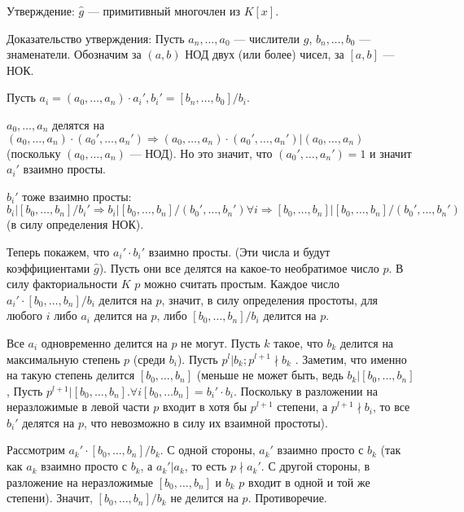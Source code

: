 \documentclass[../main.tex]{subfiles}
\begin{document}
    Утверждение: $\hat{g}$ --- примитивный многочлен из $K[x]$.

    Доказательство утверждения: Пусть $a_n, \ldots, a_0$ --- числители $g$,
    $b_n, \ldots, b_0$ --- знаменатели. Обозначим за $(a, b)$ НОД двух
    (или более) чисел, за $[a, b]$ --- НОК.

    Пусть $a_i = (a_0, \ldots, a_n) \cdot a_i',
    b_i' = [b_n, \ldots, b_0] / b_i$.

    $a_0, \ldots, a_n$ делятся на
    $(a_0, \ldots, a_n) \cdot (a_0', \ldots, a_n') \Rightarrow
    (a_0, \ldots, a_n) \cdot (a_0', \ldots, a_n') | (a_0, \ldots, a_n)$
    (поскольку $(a_0, \ldots, a_n)$ --- НОД). Но это значит, что
    $(a_0', \ldots, a_n') = 1$ и значит $a_i'$ взаимно просты.

    $b_i'$ тоже взаимно просты: $b_i | [b_0, \ldots, b_n] / b_i' \Rightarrow
    b_i | [b_0, \ldots, b_n] / (b_0', \ldots, b_n') \forall i \Rightarrow
    [b_0, \ldots, b_n] | [b_0, \ldots, b_n] / (b_0', \ldots, b_n')$
    (в силу определения НОК).

    Теперь покажем, что $a_i' \cdot b_i'$ взаимно просты.
    (Эти числа и будут коэффициентами $\hat{g}$). Пусть они все делятся
    на какое-то необратимое число $p$. В силу факториальности $K$ $p$ можно
    считать простым. Каждое число $a_i' \cdot [b_0, \ldots, b_n] / b_i$
    делится на $p$, значит, в силу определения простоты, для любого $i$
    либо $a_i$ делится на $p$, либо $[b_0, \ldots, b_n] / b_i$ делится на $p$.

    Все $a_i$ одновременно делится на $p$ не могут. Пусть $k$ такое, что
    $b_k$ делится на максимальную степень $p$ (среди $b_i$).
    Пусть $p^l | b_k; p^{l + 1} \nmid b_k$ . Заметим, что
    именно на такую степень делится $[b_0, \ldots, b_n]$
    (меньше не может быть, ведь $b_k | [b_0, \ldots, b_n]$,
    Пусть $p^{l + 1} | [b_0, \ldots, b_n].
    \forall i [b_0, \ldots b_n] = b_i' \cdot b_i$. Поскольку в разложении
    на неразложимые в левой части $p$ входит в хотя бы $p^{l + 1}$ степени, а
    $p^{l + 1} \nmid b_i$, то все $b_i'$ делятся на $p$, что невозможно в силу
    их взаимной простоты).

    Рассмотрим $a_k' \cdot [b_0, \ldots, b_n] / b_k$. С одной стороны,
    $a_k'$ взаимно просто с $b_k$ (так как $a_k$ взаимно просто с $b_k$, а
    $a_k' | a_k$, то есть $p \nmid a_k'$. С другой стороны, в разложение на
    неразложимые $[b_0, \ldots, b_n]$ и $b_k$ $p$ входит в одной и той же
    степени). Значит, $[b_0, \ldots, b_n] / b_k$ не делится на $p$.
    Противоречие.
\end{document}
